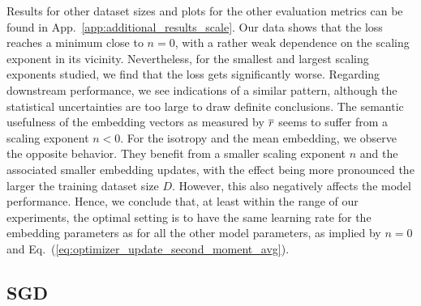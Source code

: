 Results for other dataset sizes and plots for the other evaluation metrics can be found in App.~\ref{app:additional_results_scale}.
Our data shows that the loss reaches a minimum close to $n=0$, with a rather weak dependence on the scaling exponent in its vicinity. Nevertheless, for the smallest and largest scaling exponents studied, we find that the loss gets significantly worse.
Regarding downstream performance, we see indications of a similar pattern, although the statistical uncertainties are too large to draw definite conclusions.  
The semantic usefulness of the embedding vectors as measured by $\overline{r}$ seems to suffer from a scaling exponent $n < 0$. For the isotropy and the mean embedding, we observe the opposite behavior. They benefit from a smaller scaling exponent $n$ and the associated smaller embedding updates, with the effect being more pronounced the larger the training dataset size $D$.  
However, this also negatively affects the model performance. 
Hence, we conclude that, at least within the range of our experiments, the optimal setting is to have the same learning rate for the embedding parameters as for all the other model parameters, as implied by $n=0$ and Eq.~(\ref{eq:optimizer_update_second_moment_avg}).

\subsection{SGD}
\label{sec:ablation_sgd}

